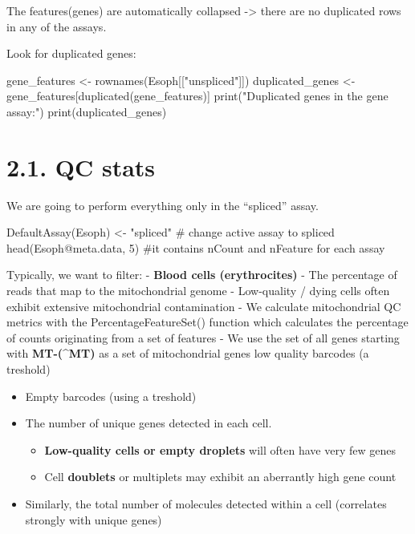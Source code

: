 \documentclass[
  letterpaper,
  DIV=11,
  numbers=noendperiod]{scrreprt}
\newenvironment{Shaded}{\begin{snugshade}}{\end{snugshade}}
\newcommand{\CommentTok}[1]{\textcolor[rgb]{0.37,0.37,0.37}{#1}}
\newcommand{\DecValTok}[1]{\textcolor[rgb]{0.68,0.00,0.00}{#1}}
\newcommand{\FunctionTok}[1]{\textcolor[rgb]{0.28,0.35,0.67}{#1}}
\newcommand{\NormalTok}[1]{\textcolor[rgb]{0.00,0.23,0.31}{#1}}
\newcommand{\OtherTok}[1]{\textcolor[rgb]{0.00,0.23,0.31}{#1}}
\newcommand{\SpecialCharTok}[1]{\textcolor[rgb]{0.37,0.37,0.37}{#1}}
\newcommand{\StringTok}[1]{\textcolor[rgb]{0.13,0.47,0.30}{#1}}
\providecommand{\tightlist}{%
  \setlength{\itemsep}{0pt}\setlength{\parskip}{0pt}}\usepackage{longtable,booktabs,array}
\begin{document}
The features(genes) are automatically collapsed -\textgreater{} there
are no duplicated rows in any of the assays.

Look for duplicated genes:

\begin{Shaded}
\begin{Highlighting}[]
\NormalTok{gene\_features }\OtherTok{\textless{}{-}} \FunctionTok{rownames}\NormalTok{(Esoph[[}\StringTok{"unspliced"}\NormalTok{]])}
\NormalTok{duplicated\_genes }\OtherTok{\textless{}{-}}\NormalTok{ gene\_features[}\FunctionTok{duplicated}\NormalTok{(gene\_features)]}
\FunctionTok{print}\NormalTok{(}\StringTok{"Duplicated genes in the \textquotesingle{}gene\textquotesingle{} assay:"}\NormalTok{)}
\FunctionTok{print}\NormalTok{(duplicated\_genes)}
\end{Highlighting}
\end{Shaded}

\section{2.1. QC stats}\label{qc-stats}

We are going to perform everything only in the ``spliced'' assay.

\begin{Shaded}
\begin{Highlighting}[]
\FunctionTok{DefaultAssay}\NormalTok{(Esoph) }\OtherTok{\textless{}{-}} \StringTok{"spliced"} \CommentTok{\# change active assay to spliced}
\FunctionTok{head}\NormalTok{(Esoph}\SpecialCharTok{@}\NormalTok{meta.data, }\DecValTok{5}\NormalTok{) }\CommentTok{\#it contains nCount and nFeature for each assay}
\end{Highlighting}
\end{Shaded}

Typically, we want to filter: - \textbf{Blood cells (erythrocites)} -
The percentage of reads that map to the mitochondrial genome -
Low-quality / dying cells often exhibit extensive mitochondrial
contamination - We calculate mitochondrial QC metrics with the
PercentageFeatureSet() function which calculates the percentage of
counts originating from a set of features - We use the set of all genes
starting with \textbf{MT-(\^{}MT)} as a set of mitochondrial genes low
quality barcodes (a treshold)

\begin{itemize}
\tightlist
\item
  Empty barcodes (using a treshold)
\item
  The number of unique genes detected in each cell.

  \begin{itemize}
  \tightlist
  \item
    \textbf{Low-quality cells or empty droplets} will often have very
    few genes
  \item
    Cell \textbf{doublets} or multiplets may exhibit an aberrantly high
    gene count
  \end{itemize}
\item
  Similarly, the total number of molecules detected within a cell
  (correlates strongly with unique genes)
\end{itemize}
\end{document}
